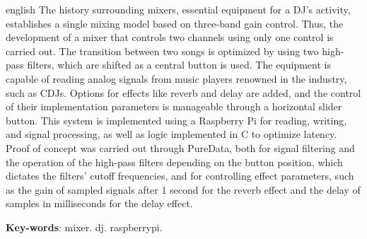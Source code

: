 \begin{resumo}[Abstract]
 \begin{otherlanguage*}{english}
   The history surrounding mixers, essential equipment for a DJ's activity, establishes a single mixing model based on three-band gain control. Thus, the development of a mixer that controls two channels using only one control is carried out. The transition between two songs is optimized by using two high-pass filters, which are shifted as a central button is used. The equipment is capable of reading analog signals from music players renowned in the industry, such as CDJs. Options for effects like reverb and delay are added, and the control of their implementation parameters is manageable through a horizontal slider button. This system is implemented using a Raspberry Pi for reading, writing, and signal processing, as well as logic implemented in C to optimize latency. Proof of concept was carried out through PureData, both for signal filtering and the operation of the high-pass filters depending on the button position, which dictates the filters' cutoff frequencies, and for controlling effect parameters, such as the gain of sampled signals after 1 second for the reverb effect and the delay of samples in milliseconds for the delay effect.


   \textbf{Key-words}: mixer. dj. raspberrypi.
 \end{otherlanguage*}
\end{resumo}
